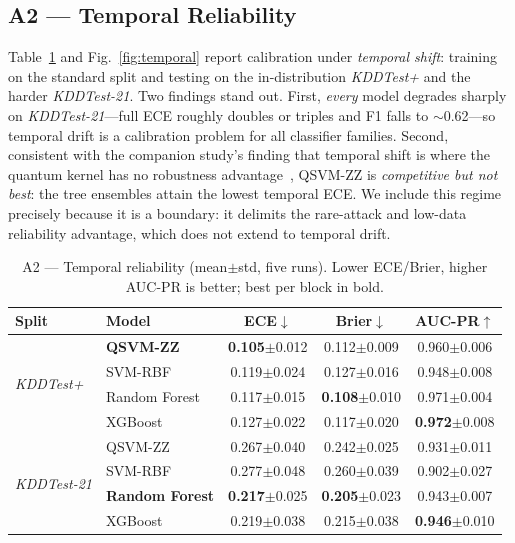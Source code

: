 \documentclass[journal]{IEEEtran}
\newcommand{\ZZ}{\textsc{ZZ}}
\newcommand{\QSVM}{QSVM-\ZZ}
\begin{document}
\subsection{A2 --- Temporal Reliability}
Table~\ref{tab:temporal} and Fig.~\ref{fig:temporal} report calibration
under \emph{temporal shift}: training on the standard split and testing
on the in-distribution \textit{KDDTest+} and the harder
\textit{KDDTest-21}. Two findings stand out. First, \emph{every} model
degrades sharply on \textit{KDDTest-21}---full ECE roughly doubles or
triples and F1 falls to $\sim$0.62---so temporal drift is a calibration
problem for all classifier families. Second, consistent with the
companion study's finding that temporal shift is where the quantum kernel
has no robustness advantage~\cite{companion}, \QSVM{} is \emph{competitive
but not best}: the tree ensembles attain the lowest temporal ECE. We
include this regime precisely because it is a boundary: it delimits the
rare-attack and low-data reliability advantage, which does not extend to
temporal drift.

\begin{table}[t]
\centering
\caption{A2 --- Temporal reliability (mean$\pm$std, five runs). Lower
  ECE/Brier, higher AUC-PR is better; best per block in bold.}
\label{tab:temporal}
\small
\begin{tabular}{llccc}
\toprule
Split & Model & ECE$\downarrow$ & Brier$\downarrow$ & AUC-PR$\uparrow$\\\midrule
\multirow{4}{*}{\textit{KDDTest+}}
 & \textbf{\QSVM{}} & \textbf{0.105}$\pm$0.012 & 0.112$\pm$0.009 & 0.960$\pm$0.006\\
 & SVM-RBF       & 0.119$\pm$0.024 & 0.127$\pm$0.016 & 0.948$\pm$0.008\\
 & Random Forest & 0.117$\pm$0.015 & \textbf{0.108}$\pm$0.010 & 0.971$\pm$0.004\\
 & XGBoost       & 0.127$\pm$0.022 & 0.117$\pm$0.020 & \textbf{0.972}$\pm$0.008\\\midrule
\multirow{4}{*}{\textit{KDDTest-21}}
 & \QSVM{}       & 0.267$\pm$0.040 & 0.242$\pm$0.025 & 0.931$\pm$0.011\\
 & SVM-RBF       & 0.277$\pm$0.048 & 0.260$\pm$0.039 & 0.902$\pm$0.027\\
 & \textbf{Random Forest} & \textbf{0.217}$\pm$0.025 & \textbf{0.205}$\pm$0.023 & 0.943$\pm$0.007\\
 & XGBoost       & 0.219$\pm$0.038 & 0.215$\pm$0.038 & \textbf{0.946}$\pm$0.010\\
\bottomrule
\end{tabular}
\end{table}
\end{document}
